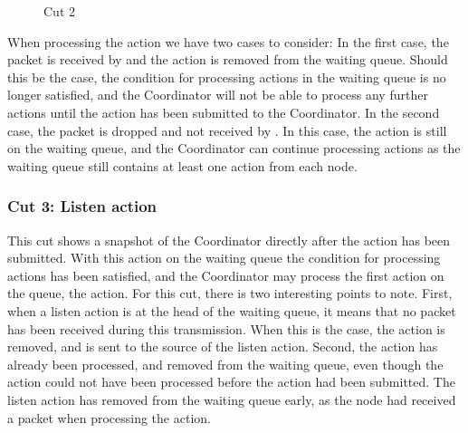 
\begin{figure}[H]
    \centering

    \caption{Cut 2}\label{tikz:coordinatormsc2}
\end{figure}

When processing the  action we have two cases to consider: In the first case, the packet is received by  and the  action is removed from the waiting queue. Should this be the case, the condition for processing actions in the waiting queue is no longer satisfied, and the Coordinator will not be able to process any further actions until the  action has been submitted to the Coordinator. In the second case, the packet is dropped and not received by . In this case, the  action is still on the waiting queue, and the Coordinator can continue processing actions as the waiting queue still contains at least one action from each node.

\subsubsection{Cut 3: Listen action}
This cut shows a snapshot of the Coordinator directly after the  action has been submitted. With this action on the waiting queue the condition for processing actions has been satisfied, and the Coordinator may process the first action on the queue, the  action. For this cut, there is two interesting points to note. First, when a listen action is at the head of the waiting queue, it means that no packet has been received during this transmission. When this is the case, the action is removed, and \KwNull is sent to the source of the listen action. Second, the  action has already been processed, and removed from the waiting queue, even though the action could not have been processed before the  action had been submitted. The listen action has removed from the waiting queue early, as the node had received a packet when processing the  action.  \smallbreak

